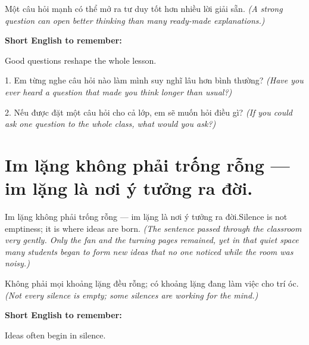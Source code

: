 \begin{baihoc}
Một câu hỏi mạnh có thể mở ra tư duy tốt hơn nhiều lời giải sẵn.
\textit{(A strong question can open better thinking than many ready-made explanations.)}
\end{baihoc}

\begin{ghinhoanh}
\textbf{Short English to remember:}

Good questions reshape the whole lesson.

\end{ghinhoanh}

\begin{tuhocnhanh}
1. Em từng nghe câu hỏi nào làm mình suy nghĩ lâu hơn bình thường? \textit{(Have you ever heard a question that made you think longer than usual?)}

2. Nếu được đặt một câu hỏi cho cả lớp, em sẽ muốn hỏi điều gì? \textit{(If you could ask one question to the whole class, what would you ask?)}
\end{tuhocnhanh}
\ngancach


\section{Im lặng không phải trống rỗng — im lặng là nơi ý tưởng ra đời.}
\begin{truyen}{Im lặng không phải trống rỗng — im lặng là nơi ý tưởng ra đời.}{Silence is not emptiness; it is where ideas are born.}
\textit{(The sentence passed through the classroom very gently. Only the fan and the turning pages remained, yet in that quiet space many students began to form new ideas that no one noticed while the room was noisy.)}
\end{truyen}

\begin{baihoc}
Không phải mọi khoảng lặng đều rỗng; có khoảng lặng đang làm việc cho trí óc.
\textit{(Not every silence is empty; some silences are working for the mind.)}
\end{baihoc}

\begin{ghinhoanh}
\textbf{Short English to remember:}

Ideas often begin in silence.

\end{ghinhoanh}

